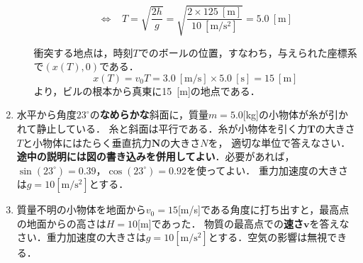 \documentclass[a4paper,11pt]{ltjsarticle}
\begin{document}
\begin{enumerate}
\begin{enumerate}[label=(\arabic*)]
        \begin{equation*}
            \Leftrightarrow \hspace{10pt} T=\sqrt{\dfrac{2h}{g}}
            = \sqrt{\dfrac{2 \times 125\ [\mathrm{m}]}{10\ [\mathrm{m/s^2}]}}=5.0\ [\mathrm{m}]
        \end{equation*}

        衝突する地点は，時刻$T$でのボールの位置，すなわち，与えられた座標系で$(x(T),0)$である．
        \begin{equation*}
            x(T)=v_0T=3.0\ [\mathrm{m/s}] \times 5.0\ [\mathrm{s}]=15\ [\mathrm{m}]
        \end{equation*}
        より，ビルの根本から真東に15\ [m]の地点である．
        \vspace{5pt}
    \end{enumerate}

\clearpage

    \item 水平から角度$23^\circ$の\textbf{なめらかな}斜面に，質量$m=5.0$[kg]の小物体が糸が引かれて静止している．
    糸と斜面は平行である．糸が小物体を引く力$\bm{T}$の大きさ$T$と小物体にはたらく垂直抗力$\bm{N}$の大きさ$N$を，
    適切な単位で答えなさい．\textbf{途中の説明には図の書き込みを併用してよい}．必要があれば，$\sin(23^\circ)=0.39$，$\cos(23^\circ)=0.92$を使ってよい．
    重力加速度の大きさは$g=10[\mathrm{m/s^2}]$とする．

    \begin{center}
        \end{center}

\clearpage

    \item 質量不明の小物体を地面から$v_0=15$[m/s]である角度に打ち出すと，最高点の地面からの高さは$H=10$[m]であった．
    物質の最高点での\textbf{速さ}$\bm{v}$を答えなさい．重力加速度の大きさは$g=10[\mathrm{m/s^2}]$とする．空気の影響は無視できる．


\end{enumerate}
\end{document}
